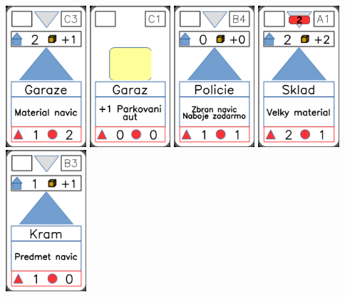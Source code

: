 \documentclass[a4paper]{article}
\begin{document}
	\includegraphics[width=3.0cm]{img-3_12}
	\includegraphics[width=3.0cm]{img-2_10}
	\includegraphics[width=3.0cm]{img-3_8}
	\includegraphics[width=3.0cm]{img-3_15}
	\includegraphics[width=3.0cm]{img-3_7}
\end{document}
